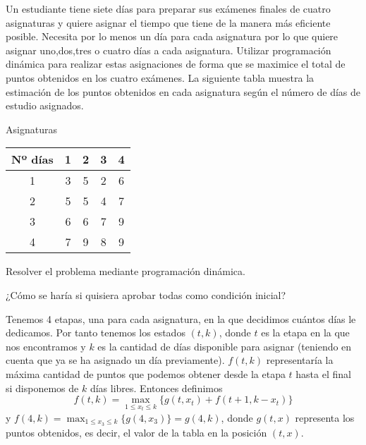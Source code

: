 \documentclass[twoside]{article}
\begin{document}
\newpage 
\begin{ejercicio}{4}
Un estudiante tiene siete días para preparar sus exámenes finales de cuatro asignaturas y
quiere asignar el tiempo que tiene de la manera más eficiente posible. Necesita por lo menos un
día para cada asignatura por lo que quiere asignar uno,dos,tres o cuatro días a cada asignatura.
Utilizar programación dinámica para realizar estas asignaciones de forma que se maximice el total
de puntos obtenidos en los cuatro exámenes. La siguiente tabla muestra la estimación de los puntos
obtenidos en cada asignatura según el número de días de estudio asignados.
\begin{center}
 Asignaturas\\
\begin{tabular}{c|c c c c}
Nº días & 1 & 2 & 3 & 4\\
\hline
1 & 3 & 5 & 2 & 6\\
2 & 5 & 5 & 4 & 7\\
3 & 6 & 6 & 7 & 9\\
4 & 7 & 9 & 8 & 9
\end{tabular}
\end{center}
Resolver el problema mediante programación dinámica.
\begin{nota}
¿Cómo se haría si quisiera aprobar todas como condición inicial?
\end{nota}
\begin{solucion}
Tenemos 4 etapas, una para cada asignatura, en la que decidimos cuántos días le dedicamos. Por tanto tenemos los estados $(t,k)$, donde $t$ es la etapa en la que nos encontramos y $k$ es la cantidad de días disponible para asignar (teniendo en cuenta que ya se ha asignado un día previamente). $f(t,k)$ representaría la máxima cantidad de puntos que podemos obtener desde la etapa $t$ hasta el final si disponemos de $k$ días libres. Entonces definimos
$$f(t,k)=\max_{1\leq x_t\leq k}\{g(t,x_t)+f(t+1,k-x_t)\}$$ y $f(4,k)=\max_{1\leq x_3\leq k}\{g(4,x_3)\}=g(4,k)$, donde $g(t,x)$ representa los puntos obtenidos, es decir, el valor de la tabla en la posición $(t,x)$.


\end{solucion}
\end{ejercicio}
\end{document}
